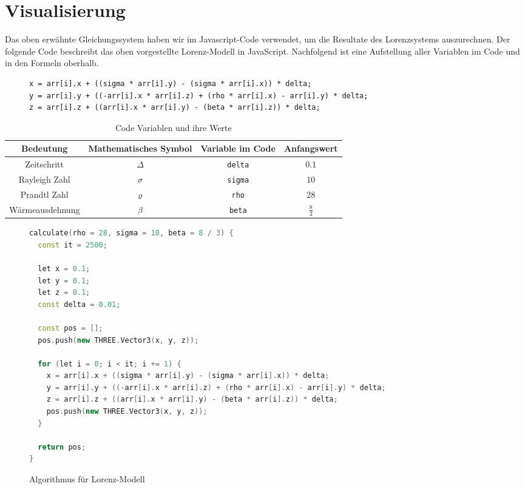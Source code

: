 
\section{Visualisierung}\label{visualisierung}
Das oben erwähnte Gleichungssystem haben wir im Javascript-Code verwendet, um die Resultate des Lorenzsystems auszurechnen. Der folgende Code beschreibt das oben vorgestellte Lorenz-Modell in JavaScript. Nachfolgend ist eine Aufstellung aller Variablen im Code und in den Formeln oberhalb.

\begin{figure}
	\begin{lstlisting}[style=C]
x = arr[i].x + ((sigma * arr[i].y) - (sigma * arr[i].x)) * delta;
y = arr[i].y + ((-arr[i].x * arr[i].z) + (rho * arr[i].x) - arr[i].y) * delta;
z = arr[i].z + ((arr[i].x * arr[i].y) - (beta * arr[i].z)) * delta;
		\end{lstlisting}
\end{figure}

	\begin{table}[]
		\centering
		\begin{tabular}{| c | c | c | c |}
			\hline
			\textbf{Bedeutung} & \textbf{Mathematisches Symbol} & \textbf{Variable im Code} & \textbf{Anfangswert}\\\hline
			Zeitschritt & $ \Delta $ & \texttt{delta} & 0.1 \\\hline
			Rayleigh Zahl & $ \sigma $ & \texttt{sigma} & 10 \\\hline
			Prandtl Zahl & $\varrho $ & \texttt{rho} & 28 \\\hline
			Wärmeausdehnung & $\beta $ & \texttt{beta}  & $ \frac{8}{3} $ \\\hline
		\end{tabular}
		\caption{Code Variablen und ihre Werte\label{CodeVariablen}}
	\end{table}

\begin{figure}
	\begin{lstlisting}[style=C, language=C++]
calculate(rho = 28, sigma = 10, beta = 8 / 3) {
  const it = 2500;

  let x = 0.1;
  let y = 0.1;
  let z = 0.1;
  const delta = 0.01;

  const pos = [];
  pos.push(new THREE.Vector3(x, y, z));

  for (let i = 0; i < it; i += 1) {
	x = arr[i].x + ((sigma * arr[i].y) - (sigma * arr[i].x)) * delta;
	y = arr[i].y + ((-arr[i].x * arr[i].z) + (rho * arr[i].x) - arr[i].y) * delta;
	z = arr[i].z + ((arr[i].x * arr[i].y) - (beta * arr[i].z)) * delta;
	pos.push(new THREE.Vector3(x, y, z));
  }

  return pos;
}
		\end{lstlisting}
		\caption{Algorithmus für Lorenz-Modell\label{AlgorithmusLorenz}}
\end{figure}

